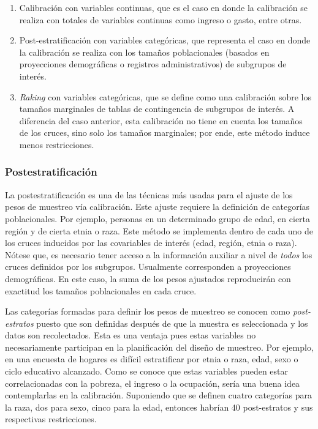 \documentclass[
  12pt,
]{book}
\providecommand{\tightlist}{%
  \setlength{\itemsep}{0pt}\setlength{\parskip}{0pt}}
\begin{document}
\begin{enumerate}
\def\labelenumi{\arabic{enumi}.}
\tightlist
\item
  Calibración con variables continuas, que es el caso en donde la calibración se realiza con totales de variables continuas como ingreso o gasto, entre otras.
\item
  Post-estratificación con variables categóricas, que representa el caso en donde la calibración se realiza con los tamaños poblacionales (basados en proyecciones demográficas o registros administrativos) de subgrupos de interés.
\item
  \emph{Raking} con variables categóricas, que se define como una calibración sobre los tamaños marginales de tablas de contingencia de subgrupos de interés. A diferencia del caso anterior, esta calibración no tiene en cuenta los tamaños de los cruces, sino solo los tamaños marginales; por ende, este método induce menos restricciones.
\end{enumerate}

\hypertarget{postestratificaciuxf3n}{%
\subsubsection{Postestratificación}\label{postestratificaciuxf3n}}

La postestratificación es una de las técnicas más usadas para el ajuste de los pesos de muestreo vía calibración. Este ajuste requiere la definición de categorías poblacionales. Por ejemplo, personas en un determinado grupo de edad, en cierta región y de cierta etnia o raza. Este método se implementa dentro de cada uno de los cruces inducidos por las covariables de interés (edad, región, etnia o raza). Nótese que, es necesario tener acceso a la información auxiliar a nivel de \emph{todos} los cruces definidos por los subgrupos. Usualmente corresponden a proyecciones demográficas. En este caso, la suma de los pesos ajustados reproducirán con exactitud los tamaños poblacionales en cada cruce.

Las categorías formadas para definir los pesos de muestreo se conocen como \emph{post-estratos} puesto que son definidas después de que la muestra es seleccionada y los datos son recolectados. Esta es una ventaja pues estas variables no necesariamente participan en la planificación del diseño de muestreo. Por ejemplo, en una encuesta de hogares es difícil estratificar por etnia o raza, edad, sexo o ciclo educativo alcanzado. Como se conoce que estas variables pueden estar correlacionadas con la pobreza, el ingreso o la ocupación, sería una buena idea contemplarlas en la calibración. Suponiendo que se definen cuatro categorías para la raza, dos para sexo, cinco para la edad, entonces habrían 40 post-estratos y sus respectivas restricciones.
\end{document}

